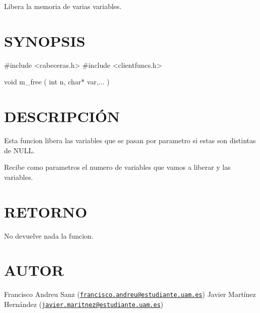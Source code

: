 Libera la memoria de varias variables.\hypertarget{unknown_case_SYNOPSIS}{}\section{S\-Y\-N\-O\-P\-S\-I\-S}\label{unknown_case_SYNOPSIS}
\begin{DoxyVerb} #include  <cabeceras.h>
   #include  <clientfuncs.h>

 void m_free ( int n,  char* var,... )
\end{DoxyVerb}
\hypertarget{unknown_case_descripcion}{}\section{D\-E\-S\-C\-R\-I\-P\-C\-IÓ\-N}\label{unknown_case_descripcion}
Esta funcion libera las variables que se pasan por parametro si estas son distintas de N\-U\-L\-L.

Recibe como parametros el numero de variables que vamos a liberar y las variables.\hypertarget{unknown_case_retorno}{}\section{R\-E\-T\-O\-R\-N\-O}\label{unknown_case_retorno}
No devuelve nada la funcion.\hypertarget{unknown_case_authors}{}\section{A\-U\-T\-O\-R}\label{unknown_case_authors}
Francisco Andreu Sanz (\href{mailto:francisco.andreu@estudiante.uam.es}{\tt francisco.\-andreu@estudiante.\-uam.\-es}) Javier Martínez Hernández (\href{mailto:javier.maritnez@estudiante.uam.es}{\tt javier.\-maritnez@estudiante.\-uam.\-es}) 

 